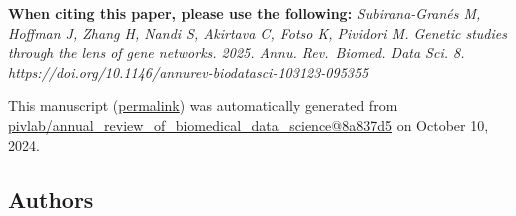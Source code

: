 { \textbf{When citing this paper, please use the following:}
\emph{Subirana-Granés M, Hoffman J, Zhang H, Nandi S, Akirtava C, Fotso K, Pividori M. Genetic studies through the lens of gene networks. 2025. Annu. Rev.~Biomed. Data Sci. 8. https://doi.org/10.1146/annurev-biodatasci-103123-095355}}

This manuscript
(\href{https://pivlab.github.io/annual_review_of_biomedical_data_science/v/8a837d579f9d6b75e3a316e920ed7a60d14fcfc5/}{permalink})
was automatically generated
from \href{https://github.com/pivlab/annual_review_of_biomedical_data_science/tree/8a837d579f9d6b75e3a316e920ed7a60d14fcfc5}{pivlab/annual\_review\_of\_biomedical\_data\_science@8a837d5}
on October 10, 2024.

\hypertarget{authors}{%
\subsection{Authors}\label{authors}}


